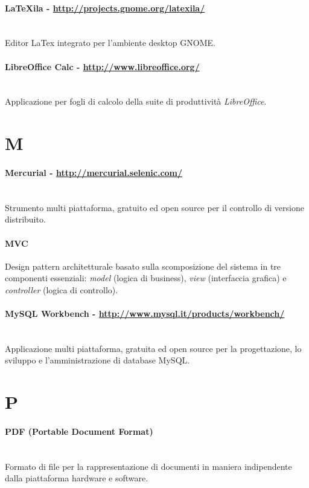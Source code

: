 \paragraph{LaTeXila - \url{http://projects.gnome.org/latexila/}} \hfill \\
Editor LaTex integrato per l'ambiente desktop GNOME.
\paragraph{LibreOffice Calc - \url{http://www.libreoffice.org/}} \hfill \\
Applicazione per fogli di calcolo della suite di produttività \textit{LibreOffice}.

\section*{M}
\paragraph{Mercurial - \url{http://mercurial.selenic.com/}} \hfill \\
Strumento multi piattaforma, gratuito ed open source per il controllo di versione distribuito.
\paragraph{MVC}
Design pattern architetturale basato sulla scomposizione del sistema in tre componenti essenziali: \textit{model} (logica di business), \textit{view} (interfaccia grafica) e \textit{controller} (logica di controllo).
\paragraph{MySQL Workbench - \url{http://www.mysql.it/products/workbench/}} \hfill \\
Applicazione multi piattaforma, gratuita ed open source per la progettazione, lo sviluppo e l'amministrazione di database MySQL.

\section*{P}
\paragraph{PDF (Portable Document Format)} \hfill \\
Formato di file per la rappresentazione di documenti in maniera indipendente dalla piattaforma hardware e software.
